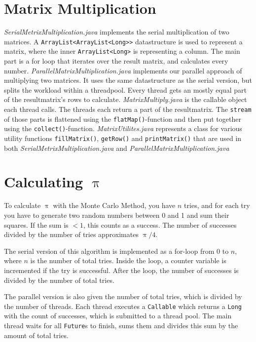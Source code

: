 \documentclass{article}
\begin{document}
  \section{Matrix Multiplication}

  \textit{SerialMetrixMultiplication.java} implements the serial multiplication of two matrices. A \texttt{ArrayList<ArrayList<Long>>} datastructure is used to represent a matrix, where the inner \texttt{ArrayList<Long>} is representing a column. The main part is a for loop that iterates over the result matrix, and calculates every number.\bigbreak
  \textit{ParallelMatrixMultiplication.java} implements our parallel approach of multiplying two matrices. It uses the same datastructure as the serial version, but splits the workload within a threadpool. Every thread gets an mostly equal part of the resultmatrix's rows to calculate. \textit{MatrixMultiply.java} is the callable object each thread calls. The threads each return a part of the resultmatrix. The \texttt{stream} of those parts is flattened using the \texttt{flatMap()}-function and then put together using the \texttt{collect()}-function. \textit{MatrixUtilites.java} represents a class for various utility functions \texttt{fillMatrix()}, \texttt{getRow()} and \texttt{printMatrix()} that are used in both \textit{SerialMetrixMultiplication.java} and \textit{ParallelMatrixMultiplication.java}

  \section{Calculating $\uppi$}

  To calculate $\uppi$ with the Monte Carlo Method, you have $n$ tries, and for each try you have to generate two random numbers between 0 and 1 and sum their squares. If the sum is $< 1$, this counts as a success. The number of successes divided by the number of tries approximates $\uppi / 4$.

  The serial version of this algorithm is implemented as a for-loop from $0$ to $n$, where $n$ is the number of total tries. Inside the loop, a counter variable is incremented if the try is successful. After the loop, the number of successes is divided by the number of total tries.

  The parallel version is also given the number of total tries, which is divided by the number of threads. Each thread executes a \texttt{Callable} which returns a \texttt{Long} with the count of successes, which is submitted to a thread pool. The main thread waits for all \texttt{Future}s to finish, sums them and divides this sum by the amount of total tries.
\end{document}

